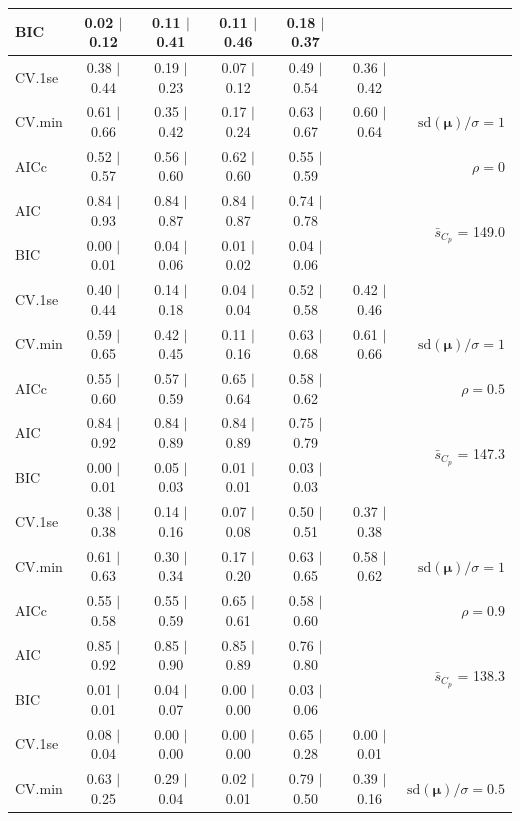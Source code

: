 \documentclass[12pt]{article}
\newcommand{\mr}[1]{\mathrm{#1}}
\newcommand{\bm}[1]{\mathbf{#1}}
\begin{document}
\begin{table}[p]
\begin{center}
\begin{tabular}{l*{5}{c}|r}
BIC & 0.02 $\mid$ 0.12 & 0.11 $\mid$ 0.41 & 0.11 $\mid$ 0.46 & 0.18 $\mid$ 0.37 & & \\
 \hline 
CV.1se & 0.38 $\mid$ 0.44 & 0.19 $\mid$ 0.23 & 0.07 $\mid$ 0.12 & 0.49 $\mid$ 0.54 & 0.36 $\mid$ 0.42 &\\
CV.min & 0.61 $\mid$ 0.66 & 0.35 $\mid$ 0.42 & 0.17 $\mid$ 0.24 & 0.63 $\mid$ 0.67 & 0.60 $\mid$ 0.64 &  $\mr{sd}(\bm{\mu})/\sigma=1$ \\
AICc & 0.52 $\mid$ 0.57 & 0.56 $\mid$ 0.60 & 0.62 $\mid$ 0.60 & 0.55 $\mid$ 0.59 & & $\rho=0$ \\
AIC & 0.84 $\mid$ 0.93 & 0.84 $\mid$ 0.87 & 0.84 $\mid$ 0.87 & 0.74 $\mid$ 0.78 & & \multirow{2}{*}{$\bar{s}_{C_p}$ = 149.0} \\
BIC & 0.00 $\mid$ 0.01 & 0.04 $\mid$ 0.06 & 0.01 $\mid$ 0.02 & 0.04 $\mid$ 0.06 & & \\
 \hline 
CV.1se & 0.40 $\mid$ 0.44 & 0.14 $\mid$ 0.18 & 0.04 $\mid$ 0.04 & 0.52 $\mid$ 0.58 & 0.42 $\mid$ 0.46 &\\
CV.min & 0.59 $\mid$ 0.65 & 0.42 $\mid$ 0.45 & 0.11 $\mid$ 0.16 & 0.63 $\mid$ 0.68 & 0.61 $\mid$ 0.66 &  $\mr{sd}(\bm{\mu})/\sigma=1$ \\
AICc & 0.55 $\mid$ 0.60 & 0.57 $\mid$ 0.59 & 0.65 $\mid$ 0.64 & 0.58 $\mid$ 0.62 & & $\rho=0.5$ \\
AIC & 0.84 $\mid$ 0.92 & 0.84 $\mid$ 0.89 & 0.84 $\mid$ 0.89 & 0.75 $\mid$ 0.79 & & \multirow{2}{*}{$\bar{s}_{C_p}$ = 147.3} \\
BIC & 0.00 $\mid$ 0.01 & 0.05 $\mid$ 0.03 & 0.01 $\mid$ 0.01 & 0.03 $\mid$ 0.03 & & \\
 \hline 
CV.1se & 0.38 $\mid$ 0.38 & 0.14 $\mid$ 0.16 & 0.07 $\mid$ 0.08 & 0.50 $\mid$ 0.51 & 0.37 $\mid$ 0.38 &\\
CV.min & 0.61 $\mid$ 0.63 & 0.30 $\mid$ 0.34 & 0.17 $\mid$ 0.20 & 0.63 $\mid$ 0.65 & 0.58 $\mid$ 0.62 &  $\mr{sd}(\bm{\mu})/\sigma=1$ \\
AICc & 0.55 $\mid$ 0.58 & 0.55 $\mid$ 0.59 & 0.65 $\mid$ 0.61 & 0.58 $\mid$ 0.60 & & $\rho=0.9$ \\
AIC & 0.85 $\mid$ 0.92 & 0.85 $\mid$ 0.90 & 0.85 $\mid$ 0.89 & 0.76 $\mid$ 0.80 & & \multirow{2}{*}{$\bar{s}_{C_p}$ = 138.3} \\
BIC & 0.01 $\mid$ 0.01 & 0.04 $\mid$ 0.07 & 0.00 $\mid$ 0.00 & 0.03 $\mid$ 0.06 & & \\
 \hline 
CV.1se & 0.08 $\mid$ 0.04 & 0.00 $\mid$ 0.00 & 0.00 $\mid$ 0.00 & 0.65 $\mid$ 0.28 & 0.00 $\mid$ 0.01 &\\
CV.min & 0.63 $\mid$ 0.25 & 0.29 $\mid$ 0.04 & 0.02 $\mid$ 0.01 & 0.79 $\mid$ 0.50 & 0.39 $\mid$ 0.16 &  $\mr{sd}(\bm{\mu})/\sigma=0.5$ \\

\end{tabular}
\end{center}
\end{table}
\end{document}

